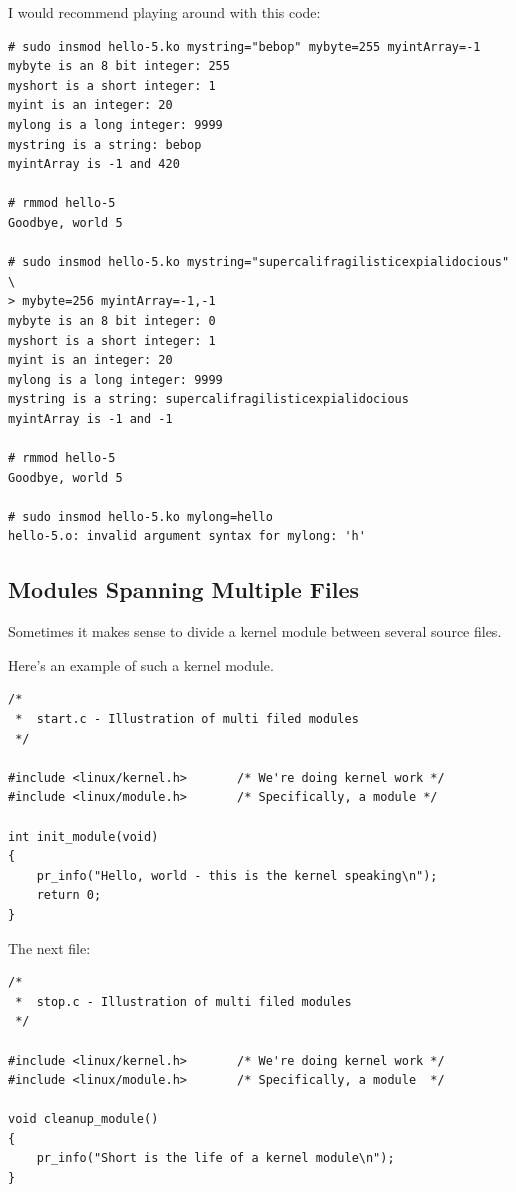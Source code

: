 \documentclass[11pt]{article}
\begin{document}
I would recommend playing around with this code:

\begin{verbatim}
# sudo insmod hello-5.ko mystring="bebop" mybyte=255 myintArray=-1
mybyte is an 8 bit integer: 255
myshort is a short integer: 1
myint is an integer: 20
mylong is a long integer: 9999
mystring is a string: bebop
myintArray is -1 and 420

# rmmod hello-5
Goodbye, world 5

# sudo insmod hello-5.ko mystring="supercalifragilisticexpialidocious" \
> mybyte=256 myintArray=-1,-1
mybyte is an 8 bit integer: 0
myshort is a short integer: 1
myint is an integer: 20
mylong is a long integer: 9999
mystring is a string: supercalifragilisticexpialidocious
myintArray is -1 and -1

# rmmod hello-5
Goodbye, world 5

# sudo insmod hello-5.ko mylong=hello
hello-5.o: invalid argument syntax for mylong: 'h'
\end{verbatim}

\subsection*{Modules Spanning Multiple Files}
\label{sec:org6595d9c}
Sometimes it makes sense to divide a kernel module between several source files.

Here's an example of such a kernel module.

\begin{verbatim}
/*
 *  start.c - Illustration of multi filed modules
 */

#include <linux/kernel.h>       /* We're doing kernel work */
#include <linux/module.h>       /* Specifically, a module */

int init_module(void)
{
    pr_info("Hello, world - this is the kernel speaking\n");
    return 0;
}
\end{verbatim}

The next file:

\begin{verbatim}
/*
 *  stop.c - Illustration of multi filed modules
 */

#include <linux/kernel.h>       /* We're doing kernel work */
#include <linux/module.h>       /* Specifically, a module  */

void cleanup_module()
{
    pr_info("Short is the life of a kernel module\n");
}
\end{verbatim}
\end{document}
